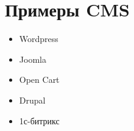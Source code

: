 \documentclass[11pt]{article}
\begin{document}
\section{Примеры CMS}
\label{sec:orgc4de6eb}

\begin{itemize}
\item Wordpress
\item Joomla
\item Open Cart
\item Drupal
\item 1с-битрикс
\end{itemize}
\end{document}
